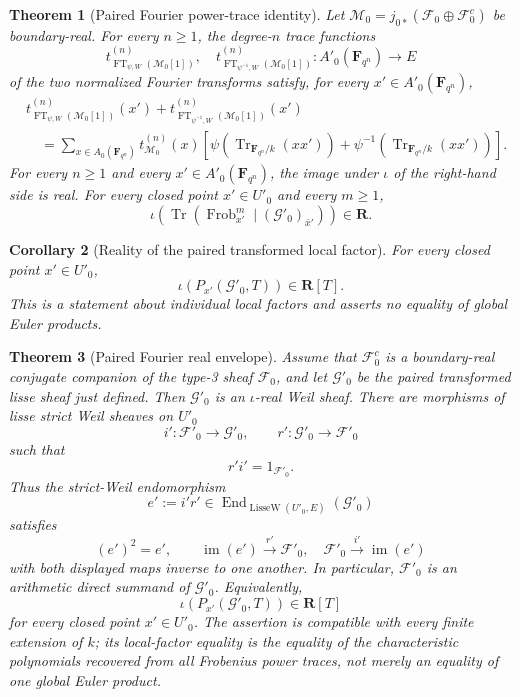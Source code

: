 \documentclass[10pt]{article}
\newtheorem{theorem}{Theorem}[section]
\newtheorem{corollary}[theorem]{Corollary}
\theoremstyle{definition}
\newcommand{\Frob}{\operatorname{Frob}}
\newcommand{\FT}{\operatorname{FT}}
\begin{document}
\begin{theorem}[Paired Fourier power-trace identity]
Let \(\mathcal M_0=j_{0*}(\mathcal F_0\oplus\mathcal F_0^c)\) be
boundary-real.  For every \(n\geq1\), the degree-\(n\) trace functions
\[
 t_{\FT_{\psi,W}(\mathcal M_0[1])}^{(n)},\quad
 t_{\FT_{\psi^{-1},W}(\mathcal M_0[1])}^{(n)}:
 A'_0(\mathbf F_{q^n})\longrightarrow E
\]
of the two normalized Fourier transforms satisfy, for every
\(x'\in A'_0(\mathbf F_{q^n})\),
\[
 \begin{aligned}
 &t_{\FT_{\psi,W}(\mathcal M_0[1])}^{(n)}(x')
 +t_{\FT_{\psi^{-1},W}(\mathcal M_0[1])}^{(n)}(x')\\
 &\quad=\sum_{x\in A_0(\mathbf F_{q^n})}t_{\mathcal M_0}^{(n)}(x)
 \left[
  \psi\!\left(\operatorname{Tr}_{\mathbf F_{q^n}/k}(xx')\right)
 +\psi^{-1}\!\left(\operatorname{Tr}_{\mathbf F_{q^n}/k}(xx')\right)
 \right].
 \end{aligned}
\]
For every \(n\geq1\) and every \(x'\in A'_0(\mathbf F_{q^n})\), the image
under \(\iota\) of the right-hand side is real.  For every closed point
\(x'\in U'_0\) and every \(m\geq1\),
\[
 \iota\!\left(
  \operatorname{Tr}\!\left(\Frob_{x'}^m\mid
  (\mathcal G'_0)_{\bar x'}\right)
 \right)\in\mathbf R.
\]
\end{theorem}

\begin{corollary}[Reality of the paired transformed local factor]
For every closed point \(x'\in U'_0\),
\[
             \iota(P_{x'}(\mathcal G'_0,T))\in\mathbf R[T].
\]
This is a statement about individual local factors and asserts no equality
of global Euler products.
\end{corollary}

\begin{theorem}[Paired Fourier real envelope]
Assume that \(\mathcal F_0^c\) is a boundary-real conjugate companion of the
type-3 sheaf \(\mathcal F_0\), and let \(\mathcal G'_0\) be the paired
transformed lisse sheaf just defined.  Then \(\mathcal G'_0\) is an
\(\iota\)-real Weil sheaf.  There are morphisms of lisse strict Weil sheaves
on \(U'_0\)
\[
 i':\mathcal F'_0\longrightarrow\mathcal G'_0,
 \qquad
 r':\mathcal G'_0\longrightarrow\mathcal F'_0
\]
such that
\[
 r'i'=1_{\mathcal F'_0}.
\]
Thus the strict-Weil endomorphism
\[
 e':=i'r'\in
 \operatorname{End}_{\operatorname{LisseW}(U'_0,E)}(\mathcal G'_0)
\]
satisfies
\[
 (e')^2=e',\qquad
 \operatorname{im}(e')\xrightarrow{\,r'\,}\mathcal F'_0,
 \quad
 \mathcal F'_0\xrightarrow{\,i'\,}\operatorname{im}(e')
\]
with both displayed maps inverse to one another.  In particular,
\(\mathcal F'_0\) is an arithmetic direct summand of \(\mathcal G'_0\).
Equivalently,
\[
               \iota(P_{x'}(\mathcal G'_0,T))\in\mathbf R[T]
\]
for every closed point \(x'\in U'_0\).  The assertion is compatible with
every finite extension of \(k\); its local-factor equality is the equality
of the characteristic polynomials recovered from all Frobenius power traces,
not merely an equality of one global Euler product.
\end{theorem}
\end{document}
